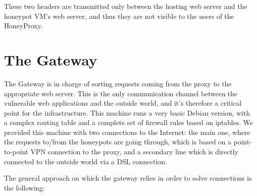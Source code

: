 These two headers are transmitted only between the hosting web server and the honeypot VM's web server, and thus they are not visible to the users of the HoneyProxy.

\section {The Gateway}

The Gateway is in charge of sorting requests coming from the proxy to the appropriate web server. This is the only communication channel between the vulnerable web applications and the outside world, and it's therefore a critical point for the infrastructure.
This machine runs a very basic Debian version, with a complex routing table and a complete set of firewall rules based on iptables. We provided this machine with two connections to the Internet: the main one, where the requests to/from the honeypots are going through, which is based on a point-to-point VPN connection to the proxy, and a secondary line which is directly connected to the outside world via a DSL connection.

The general approach on which the gateway relies in order to solve connections is the following:

